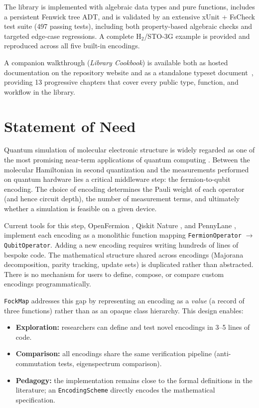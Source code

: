\documentclass[10pt,a4paper]{article}
\begin{document}
The library is implemented with algebraic data types and pure functions,
includes a persistent Fenwick tree ADT, and is validated by an extensive
xUnit + FsCheck test suite (497 passing tests), including both
property-based algebraic checks and targeted edge-case regressions.
A complete H$_2$/STO-3G example is provided and reproduced across all
five built-in encodings.

A companion walkthrough (\emph{Library Cookbook}) is available both as
hosted documentation on the repository website and as a standalone
typeset document~\cite{cookbook2026}, providing 13 progressive chapters
that cover every public type, function, and workflow in the library.

\section*{Statement of Need}

Quantum simulation of molecular electronic structure is widely regarded
as one of the most promising near-term applications of quantum computing
\citep{feynman1982,aspuruguzik2005}.  Between the molecular Hamiltonian
in second quantization and the measurements performed on quantum
hardware lies a critical middleware step: the fermion-to-qubit encoding.
The choice of encoding determines the Pauli weight of each operator (and
hence circuit depth), the number of measurement terms, and ultimately
whether a simulation is feasible on a given device.

Current tools for this step, OpenFermion \citep{mcclean2020}, Qiskit
Nature \citep{qiskit2023}, and PennyLane \citep{bergholm2022},
implement each encoding as a monolithic function mapping
\texttt{FermionOperator} $\to$ \texttt{QubitOperator}.  Adding a new
encoding requires writing hundreds of lines of bespoke code.  The
mathematical structure shared across encodings (Majorana decomposition,
parity tracking, update sets) is duplicated rather than abstracted.
There is no mechanism for users to define, compose, or compare custom
encodings programmatically.

\texttt{FockMap} addresses this gap by representing an encoding as a
\emph{value} (a record of three functions) rather than as an opaque
class hierarchy.  This design enables:

\begin{itemize}
  \item \textbf{Exploration:} researchers can define and test novel
    encodings in 3--5 lines of code.
  \item \textbf{Comparison:} all encodings share the same verification
    pipeline (anti-commutation tests, eigenspectrum comparison).
  \item \textbf{Pedagogy:} the implementation remains close to the
    formal definitions in the literature; an \texttt{EncodingScheme}
    directly encodes the mathematical specification.
\end{itemize}
\end{document}

